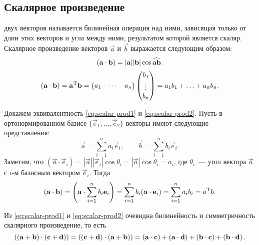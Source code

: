 \subsection{Скалярное произведение}
	 двух векторов называется билинейная операция над ними, зависящая только от длин этих векторов и угла между ними, результатом которой является скаляр. Скалярное произведение векторов $\vec{a}$ и  $\vec{b}$ выражается следующим образом:
	\begin{equation}
		 \left(\mathbf{a} \cdot \mathbf{b}\right) = |\mathbf{a}||\mathbf{b}| \cos \widehat{\mathbf{a}\mathbf{b}}. \label{eq:scalar-prod1}
	\end{equation}
	\begin{equation}
		\left(\mathbf{a} \cdot \mathbf{b}\right) = \mathbf{a}^{\operatorname{T}} \mathbf{b} = 
		 \begin{pmatrix}
		 	a_1 & \cdots & a_n 
		 \end{pmatrix}
		 \begin{pmatrix}
		 	b_1\\
		 	\vdots\\
		 	b_n
		 \end{pmatrix}
		 = a_1 b_1 + \ldots + a_n b_n.
		 \label{eq:scalar-prod2}
	\end{equation}
	
	Докажем эквивалентность \eqref{eq:scalar-prod1} и \eqref{eq:scalar-prod2}. Пусть в ортонормированном базисе $\{\vec{e}_1, \ldots, \vec{e}_2\}$ векторы имеют следующие представления:
	\begin{equation}
		\vec{a} = \sum\limits_{i = 1}^n a_i \vec{e}_i, \qquad \vec{b} = \sum\limits_{i = 1}^n b_i \vec{e}_i.
	\end{equation}
	Заметим, что $(\vec{a} \cdot \vec{e}_i) = |\vec{a}||\vec{e}_i| \cos \theta_i = |\vec{a}| \cos \theta_i = a_i$, где $\theta_i$~--- угол вектора $\vec{a}$ с $i$-м базисным вектором $\vec{e}_i$. Тогда
	\begin{equation}
		\left(\mathbf{a} \cdot \mathbf{b}\right) = \left( \mathbf{a} \cdot \sum\limits_{i=1}^n b_i\mathbf{e}_i \right) = \sum\limits_{i=1}^n b_i(\mathbf{a} \cdot \mathbf{e}_i) = \sum\limits_{i=1}^n a_i b_i = a^{\operatorname{T}}b.
	\end{equation}
	
	Из \eqref{eq:scalar-prod1} и \eqref{eq:scalar-prod2} очевидна билинейность и симметричность скалярного произведение, то есть 
	\begin{equation}
		\left(\mathbf{(a + b)} \cdot \mathbf{(c + d)}\right) = \left(\mathbf{(c + d)} \cdot \mathbf{(a + b)}\right) = \left(\mathbf{a} \cdot \mathbf{c}\right) + \left(\mathbf{a} \cdot \mathbf{d}\right) + \left(\mathbf{b} \cdot \mathbf{c}\right) + \left(\mathbf{b} \cdot \mathbf{d}\right).
	\end{equation}
	
